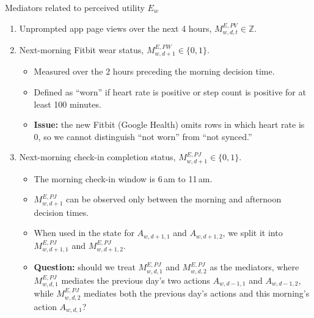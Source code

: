 \documentclass[10pt]{beamer}					%
\begin{document}
\begin{frame}{Mediators related to perceived utility $E_w$}
    \begin{enumerate}
        \item Unprompted app page views over the next 4 hours, $M^{E,PV}_{w,d,t} \in \mathbb{Z}$.
        \item Next-morning Fitbit wear status, $M^{E,FW}_{w,d+1}\in \{0,1\}$.
        \begin{itemize}
            \item Measured over the 2 hours preceding the morning decision time.
            \item Defined as ``worn'' if heart rate is positive or step count is positive for at least 100 minutes.
            \item \textbf{Issue:} the new Fitbit (Google Health) omits rows in which heart rate is 0, so we cannot distinguish ``not worn'' from ``not synced.''
        \end{itemize}
        \item Next-morning check-in completion status, $M^{E,PJ}_{w,d+1} \in \{0,1\}$.
        \begin{itemize}
            \item The morning check-in window is 6\,am to 11\,am.
            \item $M^{E,PJ}_{w,d+1}$ can be observed only between the morning and afternoon decision times.
            \item When used in the state for $A_{w,d+1,1}$ and $A_{w,d+1,2}$, we split it into $M^{E,PJ}_{w,d+1,1}$ and $M^{E,PJ}_{w,d+1,2}$.
            \item \textbf{Question:} should we treat $M^{E,PJ}_{w,d,1}$ and $M^{E,PJ}_{w,d,2}$ as the mediators, where $M^{E,PJ}_{w,d,1}$ mediates the previous day's two actions $A_{w,d-1,1}$ and $A_{w,d-1,2}$, while $M^{E,PJ}_{w,d,2}$ mediates both the previous day's actions and this morning's action $A_{w,d,1}$?
        \end{itemize}
    \end{enumerate}
\end{frame}
\end{document}
